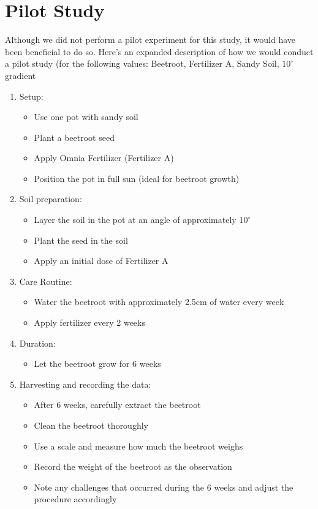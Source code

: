 \documentclass{article}
\begin{document}
\section{Pilot Study}
Although we did not perform a pilot experiment for this study, it would have been beneficial to do so. Here's an expanded description of how we would conduct a pilot study (for the following values: Beetroot, Fertilizer A, Sandy Soil, $10^{\circ}$ gradient
\begin{enumerate}
    \item Setup: 
    \begin{itemize}
        \item Use one pot with sandy soil
        \item Plant a beetroot seed
        \item Apply Omnia Fertilizer (Fertilizer A)
        \item Position the pot in full sun (ideal for beetroot growth)
    \end{itemize}
    \item Soil preparation:
    \begin{itemize}
        \item Layer the soil in the pot at an angle of approximately $10 ^{\circ}$
        \item Plant the seed in the soil
        \item Apply an initial dose of Fertilizer A
    \end{itemize}
    \item Care Routine:
    \begin{itemize}
        \item Water the beetroot with approximately 2.5cm of water every week
        \item Apply fertilizer every 2 weeks
    \end{itemize}
    \item Duration: 
    \begin{itemize}
        \item Let the beetroot grow for 6 weeks
    \end{itemize}
    \item Harvesting and recording the data:
    \begin{itemize}
        \item After 6 weeks, carefully extract the beetroot
        \item Clean the beetroot thoroughly
        \item Use a scale and measure how much the beetroot weighs
        \item Record the weight of the beetroot as the observation
        \item Note any challenges that occurred during the 6 weeks and adjust the procedure accordingly
    \end{itemize}
    
\end{enumerate}
\end{document}
